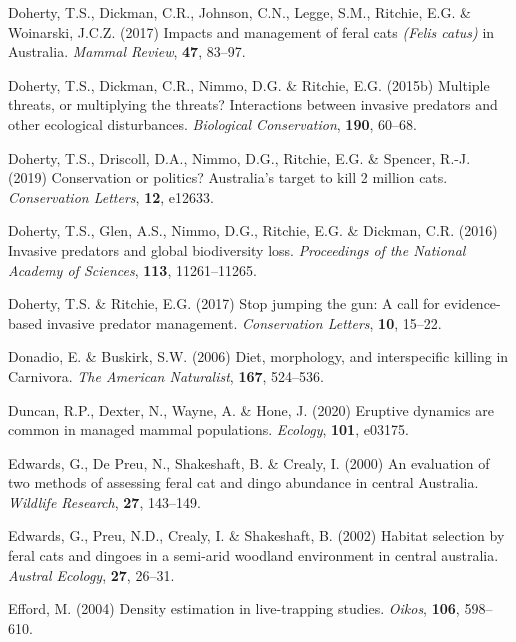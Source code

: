 \documentclass[11pt,a4paper,titlepage,twoside,openright]{style/unimelbthesis}
\begin{document}
\begin{mainmatter}
\leavevmode\hypertarget{ref-doherty2017impacts}{}%
Doherty, T.S., Dickman, C.R., Johnson, C.N., Legge, S.M., Ritchie, E.G. \& Woinarski, J.C.Z. (2017) Impacts and management of feral cats \emph{(Felis catus)} in Australia. \emph{Mammal Review}, \textbf{47}, 83--97.

\leavevmode\hypertarget{ref-doherty2015multiple}{}%
Doherty, T.S., Dickman, C.R., Nimmo, D.G. \& Ritchie, E.G. (2015b) Multiple threats, or multiplying the threats? Interactions between invasive predators and other ecological disturbances. \emph{Biological Conservation}, \textbf{190}, 60--68.

\leavevmode\hypertarget{ref-doherty2019conservation}{}%
Doherty, T.S., Driscoll, D.A., Nimmo, D.G., Ritchie, E.G. \& Spencer, R.-J. (2019) Conservation or politics? Australia's target to kill 2 million cats. \emph{Conservation Letters}, \textbf{12}, e12633.

\leavevmode\hypertarget{ref-doherty2016invasive}{}%
Doherty, T.S., Glen, A.S., Nimmo, D.G., Ritchie, E.G. \& Dickman, C.R. (2016) Invasive predators and global biodiversity loss. \emph{Proceedings of the National Academy of Sciences}, \textbf{113}, 11261--11265.

\leavevmode\hypertarget{ref-doherty2017stop}{}%
Doherty, T.S. \& Ritchie, E.G. (2017) Stop jumping the gun: A call for evidence-based invasive predator management. \emph{Conservation Letters}, \textbf{10}, 15--22.

\leavevmode\hypertarget{ref-donadio2006diet}{}%
Donadio, E. \& Buskirk, S.W. (2006) Diet, morphology, and interspecific killing in Carnivora. \emph{The American Naturalist}, \textbf{167}, 524--536.

\leavevmode\hypertarget{ref-duncan2020eruptive}{}%
Duncan, R.P., Dexter, N., Wayne, A. \& Hone, J. (2020) Eruptive dynamics are common in managed mammal populations. \emph{Ecology}, \textbf{101}, e03175.

\leavevmode\hypertarget{ref-edwards2000evaluation}{}%
Edwards, G., De Preu, N., Shakeshaft, B. \& Crealy, I. (2000) An evaluation of two methods of assessing feral cat and dingo abundance in central Australia. \emph{Wildlife Research}, \textbf{27}, 143--149.

\leavevmode\hypertarget{ref-edwards2002habitat}{}%
Edwards, G., Preu, N.D., Crealy, I. \& Shakeshaft, B. (2002) Habitat selection by feral cats and dingoes in a semi-arid woodland environment in central australia. \emph{Austral Ecology}, \textbf{27}, 26--31.

\leavevmode\hypertarget{ref-efford2004density}{}%
Efford, M. (2004) Density estimation in live-trapping studies. \emph{Oikos}, \textbf{106}, 598--610.


\end{mainmatter}
\end{document}
